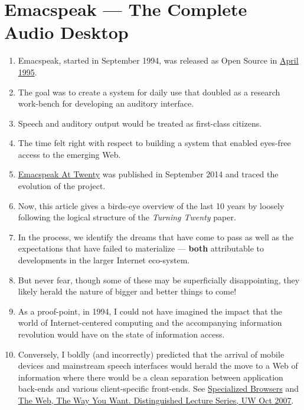 \documentclass[11pt]{article}
\begin{document}
\section{Emacspeak --- The Complete Audio Desktop}
\label{sec:org9a42d04}

\begin{enumerate}
\item Emacspeak, started in September 1994, was released as Open
Source in \href{https://tvraman.github.io/emacspeak//web/releases/release-3.0.html}{April 1995}.
\item The goal was to create a system for daily use that  doubled
as a research work-bench for developing an auditory interface.
\item Speech and auditory output would be  treated as 
first-class citizens.
\item The time felt right with respect to building a  system 
that enabled  eyes-free access to the emerging Web.
\item \href{https://emacspeak.sourceforge.net/turning-twenty.html}{Emacspeak At Twenty}  was published in September 2014 and  traced the
evolution of the project.
\item Now, this article gives a birds-eye overview of the last 10 years
by loosely following the logical structure of the  \emph{Turning Twenty} paper.
\item In the process, we identify the dreams that have come to pass as
well as the expectations that have failed to materialize --- \textbf{both}
attributable  to developments in the larger Internet eco-system.
\item But never fear, though  some of these
may be   superficially
disappointing, they likely herald the nature of bigger and better
things to come!
\item As a proof-point, in 1994, I could not have imagined the impact
that the world of Internet-centered  computing and the accompanying
information revolution would have  on the state of information
access.
\item Conversely, I boldly (and incorrectly) predicted that the
arrival of mobile devices and mainstream speech interfaces would
herald the move to a Web of information where there would be a
clean separation between application back-ends and various
client-specific front-ends. See \href{https://emacspeak.sourceforge.net/raman/publications/specialized-browsers/}{Specialized Browsers} and \href{https://youtube.com/watch?v=TZKwvBkS5cs}{The
Web, The Way You Want.  Distinguished Lecture Series, UW Oct 2007}.

\end{enumerate}
\end{document}
